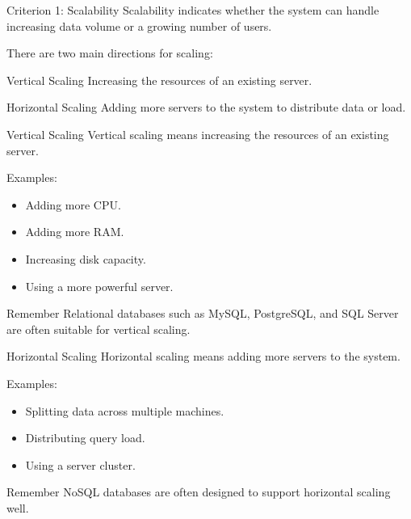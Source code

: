 \documentclass[aspectratio=169,11pt]{beamer}
\newcommand{\smallitem}{\setlength{\itemsep}{2pt}\setlength{\parskip}{0pt}}
\begin{document}
\begin{frame}{Criterion 1: Scalability}
Scalability indicates whether the system can handle increasing data volume or a growing number of users.

\vspace{2mm}
There are two main directions for scaling:
\begin{block}{Vertical Scaling}
Increasing the resources of an existing server.
\end{block}
\begin{block}{Horizontal Scaling}
Adding more servers to the system to distribute data or load.
\end{block}
\end{frame}

\begin{frame}{Vertical Scaling}
Vertical scaling means increasing the resources of an existing server.

\vspace{2mm}
Examples:
\begin{itemize}
  \smallitem
  \item Adding more CPU.
  \item Adding more RAM.
  \item Increasing disk capacity.
  \item Using a more powerful server.
\end{itemize}

\begin{block}{Remember}
Relational databases such as MySQL, PostgreSQL, and SQL Server are often suitable for vertical scaling.
\end{block}
\end{frame}

\begin{frame}{Horizontal Scaling}
Horizontal scaling means adding more servers to the system.

\vspace{2mm}
Examples:
\begin{itemize}
  \smallitem
  \item Splitting data across multiple machines.
  \item Distributing query load.
  \item Using a server cluster.
\end{itemize}

\begin{block}{Remember}
NoSQL databases are often designed to support horizontal scaling well.
\end{block}
\end{frame}
\end{document}
